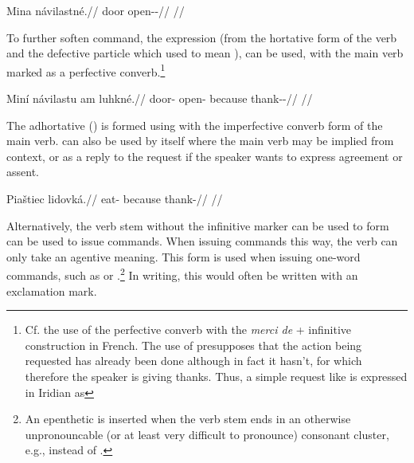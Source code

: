 \pex
\begingl
\gla Mina návilastné.//
\glb door open-\Pv{}-\Hort{}//
\glft {}//
\endgl
\xe

To further soften command, the expression  (from the hortative
form of the verb  and the defective particle 
which used to mean ),  can be used, with the main
verb marked as a perfective converb.\footnote{Cf. the use of the
perfective converb with the \textit{merci de} + infinitive construction in
French. The use of  presupposes that the action
being requested has already been done although in fact it hasn't, for which
therefore the speaker is giving thanks. Thus, a simple request like  is expressed in Iridian as }

\pex
\begingl
\gla Miní návilastu am luhkné.//
\glb door-\Gen{} open- because thank-\Pv{}-\Hort{}//
\glft {}//
\endgl
\xe

The adhortative () is formed using  with the
imperfective converb form of the main verb.  can also be used by
itself where the main verb may be implied from context, or as a reply to the
request if the speaker wants to express agreement or assent.

\pex
\begingl
\gla Piaštiec lidovká.//
\glb eat- because thank-//
\glft {}//
\endgl
\xe

Alternatively, the verb stem without the infinitive marker
 can be used to form can be used to issue commands. When issuing
commands this way, the verb can only take an agentive meaning. This form is used
when issuing one-word commands, such as  or
.\footnote{An epenthetic  is inserted when the verb
stem ends in an otherwise unpronouncable (or at least very difficult to
pronounce) consonant cluster, e.g.,  instead of
.} In writing, this would often be written with an
exclamation mark.

